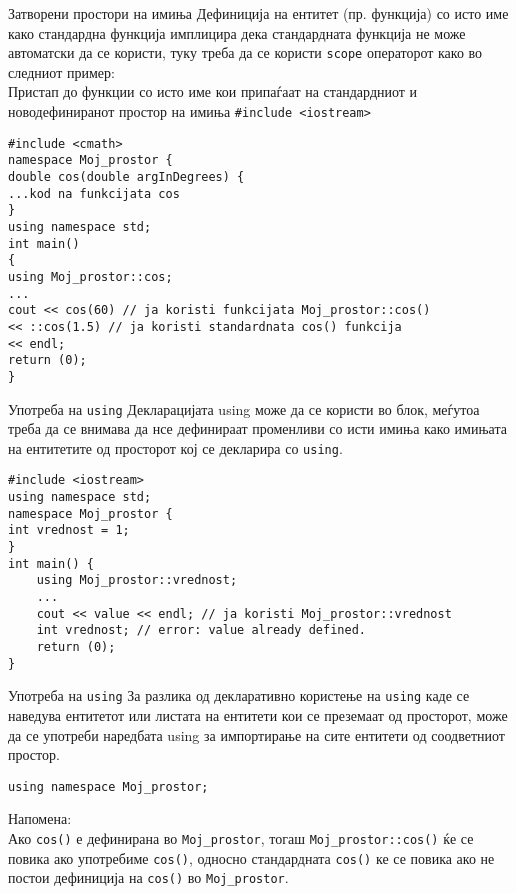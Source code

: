 \begin{frame}[fragile]{Затворени простори на имиња}
Дефиниција на ентитет (пр. функција) со исто име како стандардна функција
имплицира дека стандардната функција не може автоматски да се користи, туку
треба да се користи \texttt{scope} операторот како во следниот пример:\\
Пристап до функции со исто име кои припаѓаат на стандардниот и
новодефиниранот простор на имиња \texttt{\#include <iostream>}
\begin{lstlisting}
#include <cmath>
namespace Moj_prostor {
double cos(double argInDegrees) {
...kod na funkcijata cos
}
using namespace std;
int main()
{
using Moj_prostor::cos;
...
cout << cos(60) // ja koristi funkcijata Moj_prostor::cos()
<< ::cos(1.5) // ja koristi standardnata cos() funkcija
<< endl;
return (0);
}
\end{lstlisting}
\end{frame}

\begin{frame}[fragile]{Употреба на \texttt{using}}
Декларацијата using може да се користи во блок, меѓутоа треба да се внимава да
нсе дефинираат променливи со исти имиња како имињата на ентитетите од просторот
кој се декларира со \texttt{using}.
\begin{lstlisting}
#include <iostream>
using namespace std;
namespace Moj_prostor {
int vrednost = 1;
}
int main() {
    using Moj_prostor::vrednost;
    ...
    cout << value << endl; // ja koristi Moj_prostor::vrednost
    int vrednost; // error: value already defined.
    return (0);
}
\end{lstlisting}
\end{frame}

\begin{frame}[fragile]{Употреба на \texttt{using}}
За разлика од декларативно користење на \texttt{using} каде се наведува ентитетот или
листата на ентитети кои се преземаат од просторот, може да се употреби наредбата
using за импортирање на сите ентитети од соодветниот простор.
\begin{lstlisting}
using namespace Moj_prostor;
\end{lstlisting}
Напомена:\\
Ако \texttt{cos()} е дефинирана во \texttt{Moj\_prostor}, тогаш \texttt{Moj\_prostor::cos()}
ќе се повика ако употребиме \texttt{cos()}, односно стандардната \texttt{cos()}
ке се повика ако не постои дефиниција на \texttt{cos()} во \texttt{Moj\_prostor}.
\end{frame}

